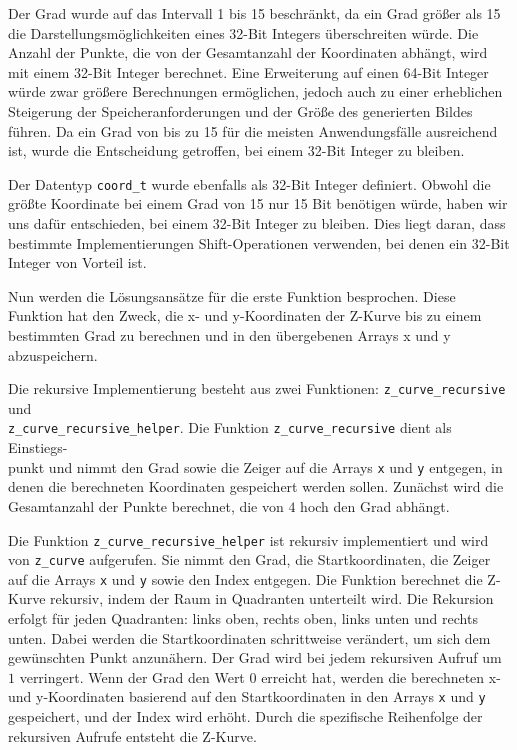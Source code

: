 \documentclass[course=erap]{aspdoc}
\begin{document}
\noindent Der Grad wurde auf das Intervall 1 bis 15 beschränkt, da ein Grad größer als 15 die Darstellungsmöglichkeiten eines 32-Bit Integers überschreiten würde. Die Anzahl der Punkte, die von der Gesamtanzahl der Koordinaten abhängt, wird mit einem 32-Bit Integer berechnet. Eine Erweiterung auf einen 64-Bit Integer würde zwar größere Berechnungen ermöglichen, jedoch auch zu einer erheblichen Steigerung der Speicheranforderungen und der Größe des generierten Bildes führen. Da ein Grad von bis zu 15 für die meisten Anwendungsfälle ausreichend ist, wurde die Entscheidung getroffen, bei einem 32-Bit Integer zu bleiben.
\setlength{\parskip}{1em}

\noindent Der Datentyp \texttt{coord\_t} wurde ebenfalls als 32-Bit Integer definiert. Obwohl die größte Koordinate bei einem Grad von 15 nur 15 Bit benötigen würde, haben wir uns dafür entschieden, bei einem 32-Bit Integer zu bleiben. Dies liegt daran, dass bestimmte Implementierungen Shift-Operationen verwenden, bei denen ein 32-Bit Integer von Vorteil ist.
\setlength{\parskip}{1em}

\noindent Nun werden die Lösungsansätze für die erste Funktion besprochen. Diese Funktion hat den Zweck, die x- und y-Koordinaten der Z-Kurve bis zu einem bestimmten Grad zu berechnen und in den übergebenen Arrays x und y abzuspeichern.
\setlength{\parskip}{1em}

\noindent Die rekursive Implementierung besteht aus zwei Funktionen: \texttt{z\_curve\_recursive} und\\ \texttt{z\_curve\_recursive\_helper}. Die Funktion \texttt{z\_curve\_recursive} dient als Einstiegs- \\punkt und nimmt den Grad sowie die Zeiger auf die Arrays \texttt{x} und \texttt{y} entgegen, in denen die berechneten Koordinaten gespeichert werden sollen. Zunächst wird die Gesamtanzahl der Punkte berechnet, die von $4$ hoch den Grad abhängt.
\setlength{\parskip}{1em}

\noindent Die Funktion \texttt{z\_curve\_recursive\_helper} ist rekursiv implementiert und wird von \texttt{z\_curve} aufgerufen. Sie nimmt den Grad, die Startkoordinaten, die Zeiger auf die Arrays \texttt{x} und \texttt{y} sowie den Index entgegen. Die Funktion berechnet die Z-Kurve rekursiv, indem der Raum in Quadranten unterteilt wird. Die Rekursion erfolgt für jeden Quadranten: links oben, rechts oben, links unten und rechts unten. Dabei werden die Startkoordinaten schrittweise verändert, um sich dem gewünschten Punkt anzunähern. Der Grad wird bei jedem rekursiven Aufruf um $1$ verringert. Wenn der Grad den Wert $0$ erreicht hat, werden die berechneten x- und y-Koordinaten basierend auf den Startkoordinaten in den Arrays \texttt{x} und \texttt{y} gespeichert, und der Index wird erhöht. Durch die spezifische Reihenfolge der rekursiven Aufrufe entsteht die Z-Kurve.
\setlength{\parskip}{1em}
\end{document}
